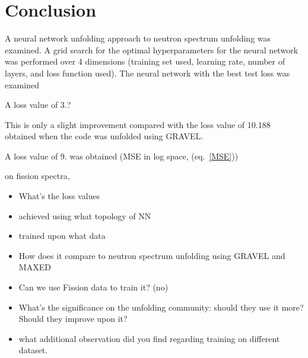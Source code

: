 \documentclass[a4paper, 12pt]{article}
\begin{document}
\section{Conclusion}
A neural network unfolding approach to neutron spectrum unfolding was examined. A grid search for the optimal hyperparameters for the neural network was performed over 4 dimensions (training set used, learning rate, number of layers, and loss function used). The neural network with the best test loss was examined%

A loss value of 3.?

This is only a slight improvement compared with the loss value of 10.188 obtained when the code was unfolded using GRAVEL.

A loss value of 9. was obtained (MSE in log space, (eq.~\ref{MSE}))

on fission spectra,

\begin{itemize}
    \item What's the loss values
    \item achieved using what topology of NN
    \item trained upon what data
    \item How does it compare to neutron spectrum unfolding using GRAVEL and MAXED
    \item Can we use Fission data to train it? (no)
    \item What's the significance on the unfolding community: should they use it more? Should they improve upon it?
    \item what additional observation did you find regarding training on different dataset.
\end{itemize}



\end{document}
